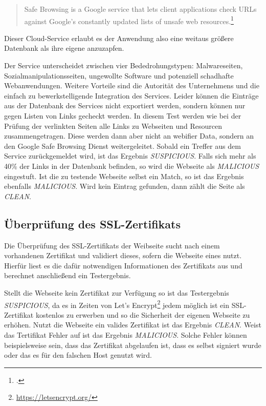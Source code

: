 \begin{quote}
	Safe Browsing is a Google service that lets client applications check URLs against Google's constantly updated lists of unsafe web resources.\footcite[Vgl.][]{googleSafeBrowsing}
\end{quote}

Dieser Cloud-Service erlaubt es der Anwendung also eine weitaus größere Datenbank als ihre eigene anzuzapfen.

Der Service unterscheidet zwischen vier Bededrohungstypen\label{par:konzep-gsb-types}: Malwareseiten, Sozialmanipulationsseiten, ungewollte Software und potenziell schadhafte Webanwendungen.
Weitere Vorteile sind die Autorität des Unternehmens und die einfach zu bewerkstelligende Integration des Services.
Leider können die Einträge aus der Datenbank des Services nicht exportiert werden, sondern können nur gegen Listen von Links gecheckt werden.
In diesem Test werden wie bei der Prüfung der verlinkten Seiten alle Links zu Webseiten und Resourcen zusammengetragen.
Diese werden dann aber nicht an webifier Data, sondern an den Google Safe Browsing Dienst weitergeleitet.
Sobald ein Treffer aus dem Service zurückgemeldet wird, ist das Ergebnis \textit{SUSPICIOUS}.
Falls sich mehr als 40\% der Links in der Datenbank befinden, so wird die Webseite als \textit{MALICIOUS} eingestuft.
Ist die zu testende Webseite selbst ein Match, so ist das Ergebnis ebenfalls \textit{MALICIOUS}.
Wird kein Eintrag gefunden, dann zählt die Seite als \textit{CLEAN}.

\subsection{Überprüfung des SSL-Zertifikats}

Die Überprüfung des SSL-Zertifikats der Weibseite sucht nach einem vorhandenen Zertifikat und validiert dieses, sofern die Webseite eines nutzt. Hierfür liest es die dafür notwendigen Informationen des  Zertifikats aus und berechnet anschließend ein Testergebnis.

Stellt die Webseite kein Zertifikat zur Verfügung so ist das Testergebnis \textit{SUSPICIOUS}, da es in Zeiten von Let's Encrypt\footnote{\url{https://letsencrypt.org/}} jedem möglich ist ein SSL-Zertifikat kostenlos zu erwerben und so die Sicherheit der eigenen Webseite zu erhöhen. Nutzt die Webseite ein valides Zertifikat ist das Ergebnis \textit{CLEAN}. Weist das Tertifikat Fehler auf ist das Ergebnis \textit{MALICIOUS}. Solche Fehler können beispielsweise sein, dass das Zertifikat abgelaufen ist, dass es selbst signiert wurde oder das es für den falschen Host genutzt wird.

